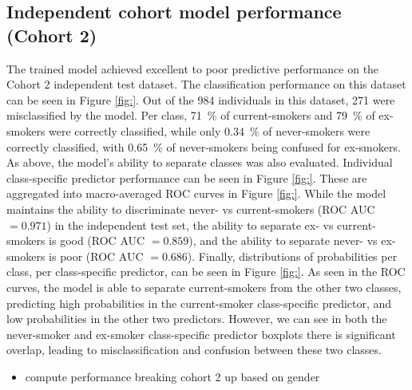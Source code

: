 \documentclass{article}
\begin{document}
\subsection{Independent cohort model performance (Cohort 2)} \label{sec:cohort2-performance}
The trained model achieved excellent to poor predictive performance on the Cohort 2 independent test dataset. The classification performance on this dataset can be seen in Figure \ref{fig:}. Out of the 984 individuals in this dataset, 271 were misclassified by the model. Per class, \SI{71}{\percent} of current-smokers and \SI{79}{\percent} of ex-smokers were correctly classified, while only \SI{0.34}{\percent} of never-smokers were correctly classified, with \SI{0.65}{\percent} of never-smokers being confused for ex-smokers. As above, the model's ability to separate classes was also evaluated. Individual class-specific predictor performance can be seen in Figure \ref{fig:}. These are aggregated into macro-averaged ROC curves in Figure \ref{fig:}. While the model maintains the ability to discriminate never- vs current-smokers (ROC AUC \(=0.971\)) in the independent test set, the ability to separate ex- vs current-smokers is good (ROC AUC \(=0.859\)), and the ability to separate never- vs ex-smokers is poor (ROC AUC \(=0.686\)). Finally, distributions of probabilities per class, per class-specific predictor, can be seen in Figure \ref{fig:}. As seen in the ROC curves, the model is able to separate current-smokers from the other two classes, predicting high probabilities in the current-smoker class-specific predictor, and low probabilities in the other two predictors. However, we can see in both the never-smoker and ex-smoker class-specific predictor boxplots there is significant overlap, leading to misclassification and confusion between these two classes.

\begin{itemize}
    \item compute performance breaking cohort 2 up based on gender
\end{itemize}
\end{document}

